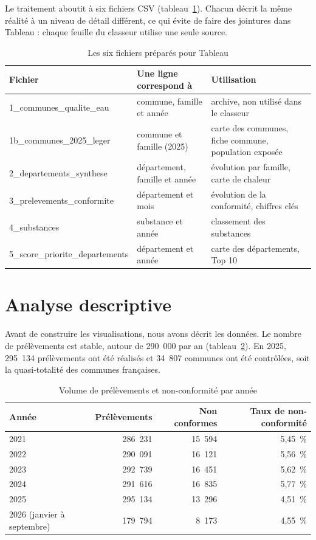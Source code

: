 \documentclass[11pt,a4paper]{article}
\begin{document}
Le traitement aboutit à six fichiers CSV (tableau~\ref{tab:fichiers}). Chacun décrit la même réalité à un niveau de détail différent, ce qui évite de faire des jointures dans Tableau : chaque feuille du classeur utilise une seule source.

\begin{table}[H]
\centering
\small
\begin{tabular}{>{\raggedright}p{5.4cm} >{\raggedright}p{3.8cm} >{\raggedright\arraybackslash}p{4.8cm}}
\toprule
Fichier & Une ligne correspond à & Utilisation \\
\midrule
1\_communes\_qualite\_eau & commune, famille et année & archive, non utilisé dans le classeur \\
1b\_communes\_2025\_leger & commune et famille (2025) & carte des communes, fiche commune, population exposée \\
2\_departements\_synthese & département, famille et année & évolution par famille, carte de chaleur \\
3\_prelevements\_conformite & département et mois & évolution de la conformité, chiffres clés \\
4\_substances & substance et année & classement des substances \\
5\_score\_priorite\_departements & département et année & carte des départements, Top 10 \\
\bottomrule
\end{tabular}
\caption{Les six fichiers préparés pour Tableau}
\label{tab:fichiers}
\end{table}

\section{Analyse descriptive}

Avant de construire les visualisations, nous avons décrit les données. Le nombre de prélèvements est stable, autour de 290~000 par an (tableau~\ref{tab:volumes}). En 2025, 295~134 prélèvements ont été réalisés et 34~807 communes ont été contrôlées, soit la quasi-totalité des communes françaises.

\begin{table}[H]
\centering
\small
\begin{tabular}{lrrr}
\toprule
Année & Prélèvements & Non conformes & Taux de non-conformité \\
\midrule
2021 & 286~231 & 15~594 & 5,45~\% \\
2022 & 290~091 & 16~121 & 5,56~\% \\
2023 & 292~739 & 16~451 & 5,62~\% \\
2024 & 291~616 & 16~835 & 5,77~\% \\
2025 & 295~134 & 13~296 & 4,51~\% \\
2026 (janvier à septembre) & 179~794 & 8~173 & 4,55~\% \\
\bottomrule
\end{tabular}
\caption{Volume de prélèvements et non-conformité par année}
\label{tab:volumes}
\end{table}
\end{document}

